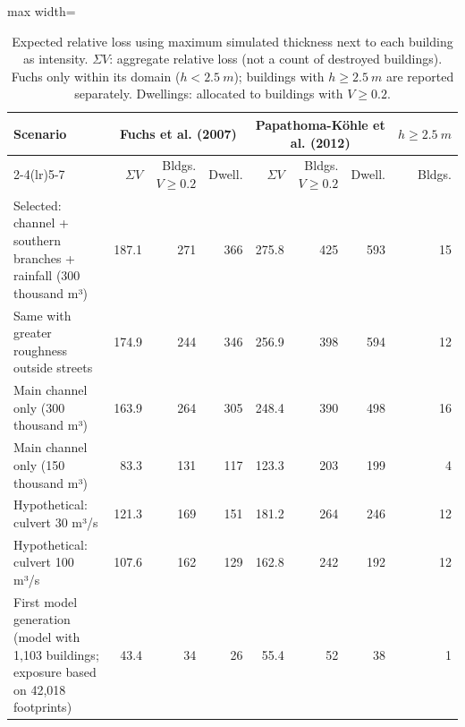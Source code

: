 \begin{table}[htbp]\centering\small
\caption{Expected relative loss using maximum simulated thickness next to each building as intensity. $\Sigma V$: aggregate relative loss (not a count of destroyed buildings). Fuchs only within its domain ($h<\SI{2.5}{m}$); buildings with $h\geq\SI{2.5}{m}$ are reported separately. Dwellings: allocated to buildings with $V\geq0.2$.}\label{tab:danio}
\begin{adjustbox}{max width=\textwidth}\begin{tabular}{p{}rrrrrrr}\toprule
Scenario & \multicolumn{3}{c}{Fuchs et al. (2007)} & \multicolumn{3}{c}{Papathoma-Köhle et al. (2012)} & $h\geq\SI{2.5}{m}$\\\cmidrule(lr){2-4}\cmidrule(lr){5-7}
 & $\Sigma V$ & Bldgs. $V\geq0.2$ & Dwell. & $\Sigma V$ & Bldgs. $V\geq0.2$ & Dwell. & Bldgs.\\\midrule
Selected: channel + southern branches + rainfall (300 thousand m³) & 187.1 & 271 & 366 & 275.8 & 425 & 593 & 15\\
Same with greater roughness outside streets & 174.9 & 244 & 346 & 256.9 & 398 & 594 & 12\\
Main channel only (300 thousand m³) & 163.9 & 264 & 305 & 248.4 & 390 & 498 & 16\\
Main channel only (150 thousand m³) & 83.3 & 131 & 117 & 123.3 & 203 & 199 & 4\\
Hypothetical: culvert 30 m³/s & 121.3 & 169 & 151 & 181.2 & 264 & 246 & 12\\
Hypothetical: culvert 100 m³/s & 107.6 & 162 & 129 & 162.8 & 242 & 192 & 12\\
First model generation (model with 1,103 buildings; exposure based on 42,018 footprints) & 43.4 & 34 & 26 & 55.4 & 52 & 38 & 1\\
\bottomrule\end{tabular}\end{adjustbox}\end{table}
